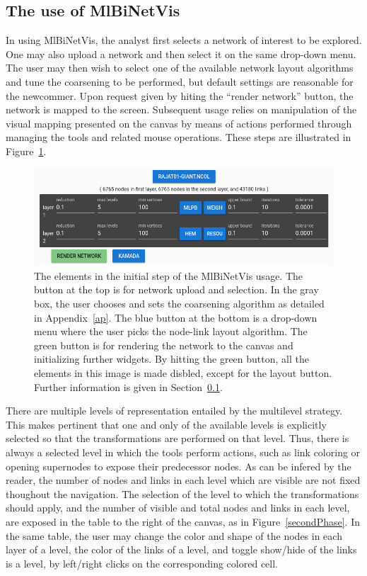 \documentclass[runningheads]{llncs}
\begin{document}
\subsection{The use of MlBiNetVis}\label{use}
In using MlBiNetVis,
the analyst first selects a network of interest to be explored.
One may also upload a network and then select it on the same drop-down menu.
The user may then wish to select one of the available network layout
algorithms and tune the coarsening to be performed, but default settings are reasonable
for the newcommer.
Upon request given by hiting the ``render network'' button,
the network is mapped to the screen.
Subsequent usage relies on manipulation of the visual mapping presented on the
canvas by means of actions
performed through managing the tools and related mouse operations.
These steps are illustrated in Figure~\ref{initial}.
\begin{figure}[!h]\centering
 \includegraphics[width=\textwidth]{initial_}
  \caption{The elements in the initial step of the MlBiNetVis usage.
  The button at the top is for network upload and selection.
  In the gray box, the user chooses and sets the coarsening algorithm as detailed in Appendix~\ref{ap}.
  The blue button at the bottom is a drop-down menu where the user picks the node-link
  layout algorithm.
  The green button is for rendering the network to the canvas and initializing further widgets.
  By hitting the green button, all the elements in this image is made disbled, except for the layout
  button.
  Further information is given in Section~\ref{use}.
  }\label{initial}
\end{figure}

There are multiple levels of representation entailed by the multilevel strategy.
This makes pertinent that one and only of the available levels is explicitly selected
so that the transformations are performed on that level.
Thus, there is always a selected level in which the tools perform actions, such
as link coloring or opening supernodes to expose their predecessor nodes.
As can be infered by the reader,
the number of nodes and links in each level which are visible are not fixed thoughout the
navigation.
The selection of the level to which the transformations should apply, and the number
of visible and total nodes and links in each level, are exposed in the table to the right
of the canvas, as in Figure~\ref{secondPhase}.
In the same table, the user may change the color and shape of the nodes in each layer of
a level, the color of the links of a level, and toggle show/hide of the links is a level,
by left/right clicks on the corresponding colored cell.
\end{document}
